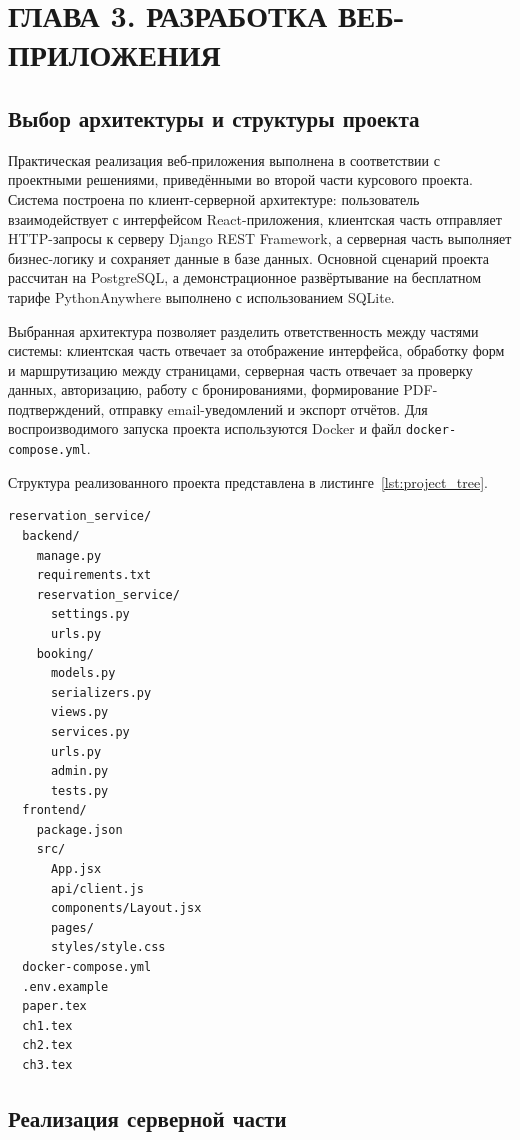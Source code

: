 \section*{ГЛАВА 3. РАЗРАБОТКА ВЕБ-ПРИЛОЖЕНИЯ}

\subsection{Выбор архитектуры и структуры проекта}

Практическая реализация веб-приложения выполнена в соответствии с проектными
решениями, приведёнными во второй части курсового проекта. Система построена по
клиент-серверной архитектуре: пользователь взаимодействует с интерфейсом
React-приложения, клиентская часть отправляет HTTP-запросы к серверу Django REST
Framework, а серверная часть выполняет бизнес-логику и сохраняет данные в
базе данных. Основной сценарий проекта рассчитан на PostgreSQL, а демонстрационное
развёртывание на бесплатном тарифе PythonAnywhere выполнено с использованием SQLite.

Выбранная архитектура позволяет разделить ответственность между частями системы:
клиентская часть отвечает за отображение интерфейса, обработку форм и маршрутизацию
между страницами, серверная часть отвечает за проверку данных, авторизацию,
работу с бронированиями, формирование PDF-подтверждений, отправку email-уведомлений
и экспорт отчётов. Для воспроизводимого запуска проекта используются Docker и
файл \texttt{docker-compose.yml}.

Структура реализованного проекта представлена в листинге~\ref{lst:project_tree}.

\begin{lstlisting}[caption={Структура реализованного проекта}, label={lst:project_tree}]
reservation_service/
  backend/
    manage.py
    requirements.txt
    reservation_service/
      settings.py
      urls.py
    booking/
      models.py
      serializers.py
      views.py
      services.py
      urls.py
      admin.py
      tests.py
  frontend/
    package.json
    src/
      App.jsx
      api/client.js
      components/Layout.jsx
      pages/
      styles/style.css
  docker-compose.yml
  .env.example
  paper.tex
  ch1.tex
  ch2.tex
  ch3.tex
\end{lstlisting}

\subsection{Реализация серверной части}

